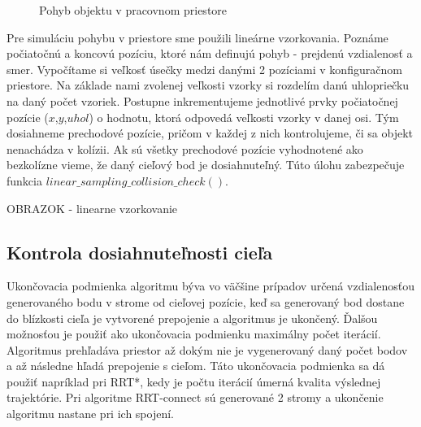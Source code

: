 \begin{figure}[h!]
	\centering
	\caption{Pohyb objektu v pracovnom priestore} \label{OBRAZOK 4.5} 
\end{figure} 


Pre simuláciu pohybu v priestore sme použili lineárne vzorkovania. Poznáme počiatočnú a koncovú pozíciu, ktoré nám definujú pohyb - prejdenú vzdialenosť a smer. Vypočítame si veľkosť úsečky medzi danými 2 pozíciami v konfiguračnom priestore. Na základe nami zvolenej veľkosti vzorky si rozdelím danú uhlopriečku na daný počet vzoriek. Postupne inkrementujeme jednotlivé prvky počiatočnej pozície ($ x $,$ y $,$ uhol $) o hodnotu, ktorá odpovedá veľkosti vzorky v danej osi. Tým dosiahneme prechodové pozície, pričom v každej z nich kontrolujeme, či sa objekt nenachádza v kolízii.  Ak sú všetky prechodové pozície vyhodnotené ako bezkolízne vieme, že daný cieľový bod je dosiahnuteľný.
Túto úlohu zabezpečuje funkcia $ linear\_sampling\_collision\_check()$.

OBRAZOK - linearne vzorkovanie


\subsection{Kontrola dosiahnuteľnosti cieľa}

Ukončovacia podmienka algoritmu býva vo väčšine prípadov určená vzdialenosťou generovaného bodu v strome od cieľovej pozície, keď sa generovaný bod dostane do blízkosti cieľa je vytvorené prepojenie a algoritmus je ukončený. Ďalšou možnosťou je použiť ako ukončovacia podmienku maximálny počet iterácií. Algoritmus prehľadáva priestor až dokým nie je vygenerovaný daný počet bodov a až následne hľadá prepojenie s cieľom. Táto ukončovacia podmienka sa dá použiť napríklad pri RRT*, kedy je počtu iterácií úmerná kvalita výslednej trajektórie. Pri algoritme RRT-connect sú generované 2 stromy a ukončenie algoritmu
nastane pri ich spojení.

